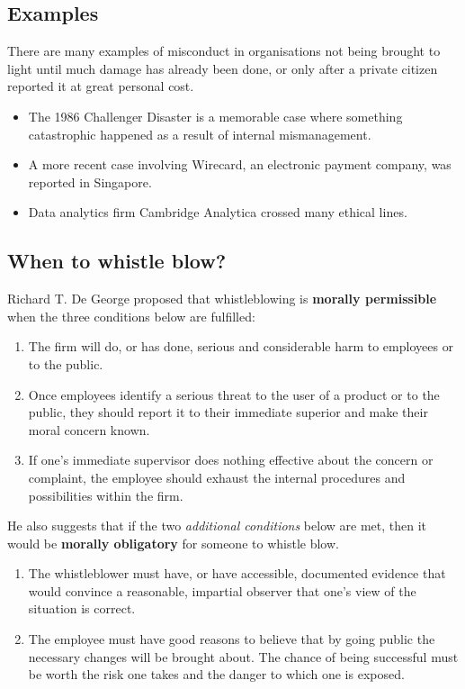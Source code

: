 \documentclass[11pt]{article}
\begin{document}
\subsection{Examples}
\label{sec:org13136a5}
There are many examples of misconduct in organisations not being brought to light until much damage has already been done, or only after a private citizen reported it at great personal cost.
\begin{itemize}
\item The 1986 Challenger Disaster is a memorable case where something catastrophic happened as a result of internal mismanagement.
\item A more recent case involving Wirecard, an electronic payment company, was reported in Singapore.
\item Data analytics firm Cambridge Analytica crossed many ethical lines.
\end{itemize}
\subsection{When to whistle blow?}
\label{sec:orgd26dfe5}
Richard T. De George proposed that whistleblowing is \textbf{morally permissible} when the three conditions below are fulfilled:
\begin{enumerate}
\item The firm will do, or has done, serious and considerable harm to employees or to the public.
\item Once employees identify a serious threat to the user of a product or to the public, they should report it to their immediate superior and make their moral concern known.
\item If one's immediate supervisor does nothing effective about the concern or complaint, the employee should exhaust the internal procedures and possibilities within the firm.
\end{enumerate}

He also suggests that if the two \emph{additional conditions} below are met, then it would be \textbf{morally obligatory} for someone to whistle blow.
\begin{enumerate}
\item The whistleblower must have, or have accessible, documented evidence that would convince a reasonable, impartial observer that one's view of the situation is correct.
\item The employee must have good reasons to believe that by going public the necessary changes will be brought about. The chance of being successful must be worth the risk one takes and the danger to which one is exposed.
\end{enumerate}
\end{document}

